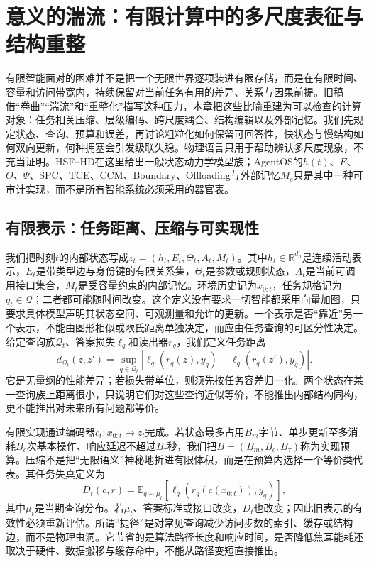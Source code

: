 \chapter{意义的湍流：有限计算中的多尺度表征与结构重整}
\label{chp:meaning_turbulence}

有限智能面对的困难并不是把一个无限世界逐项装进有限存储，而是在有限时间、容量和访问带宽内，持续保留对当前任务有用的差异、关系与因果前提。旧稿借“卷曲”“湍流”和“重整化”描写这种压力，本章把这些比喻重建为可以检查的计算对象：任务相关压缩、层级编码、跨尺度耦合、结构编辑以及外部记忆。我们先规定状态、查询、预算和误差，再讨论粗粒化如何保留可回答性，快状态与慢结构如何双向更新，何种拥塞会引发级联失稳。物理语言只用于帮助辨认多尺度现象，不充当证明。HSF--HD在这里给出一般状态动力学模型族；AgentOS的$h(t)$、$E$、$\Theta$、$\Psi$、SPC、TCE、CCM、Boundary、Offloading与外部记忆$M_e$只是其中一种可审计实现，而不是所有智能系统必须采用的器官表。

\section{有限表示：任务距离、压缩与可实现性}
\label{sec:geometry_limit}

我们把时刻$t$的内部状态写成$z_t=(h_t,E_t,\Theta_t,A_t,M_t)$。其中$h_t\in\mathbb{R}^{d_h}$是连续活动表示，$E_t$是带类型边与身份键的有限关系集，$\Theta_t$是参数或规则状态，$A_t$是当前可调用接口集合，$M_t$是受容量约束的内部记忆。环境历史记为$x_{0:t}$，任务规格记为$q_t\in\mathcal Q$；二者都可能随时间改变。这个定义没有要求一切智能都采用向量加图，只要求具体模型声明其状态空间、可观测量和允许的更新。一个表示是否“靠近”另一个表示，不能由图形相似或欧氏距离单独决定，而应由任务查询的可区分性决定。给定查询族$\mathcal Q_t$、答案损失$\ell_q$和读出器$r_q$，我们定义任务距离
\begin{equation}
 d_{\mathcal Q_t}(z,z')=\sup_{q\in\mathcal Q_t}\left|\ell_q(r_q(z),y_q)-\ell_q(r_q(z'),y_q)\right| .
\end{equation}
它是无量纲的性能差异；若损失带单位，则须先按任务容差归一化。两个状态在某一查询族上距离很小，只说明它们对这些查询近似等价，不能推出内部结构同构，更不能推出对未来所有问题都等价。

有限实现通过编码器$c_t:x_{0:t}\mapsto z_t$完成。若状态最多占用$B_m$字节、单步更新至多消耗$B_c$次基本操作、响应延迟不超过$B_\tau$秒，我们把$B=(B_m,B_c,B_\tau)$称为实现预算。压缩不是把“无限语义”神秘地折进有限体积，而是在预算内选择一个等价类代表。其任务失真定义为
\begin{equation}
 D_t(c,r)=\mathbb E_{q\sim\mu_t}\!\left[\ell_q(r_q(c(x_{0:t})),y_q)\right],
\end{equation}
其中$\mu_t$是当期查询分布。若$\mu_t$、答案标准或接口改变，$D_t$也改变；因此旧表示的有效性必须重新评估。所谓“捷径”是对常见查询减少访问步数的索引、缓存或结构边，而不是物理虫洞。它节省的是算法路径长度和响应时间，是否降低焦耳能耗还取决于硬件、数据搬移与缓存命中，不能从路径变短直接推出。

